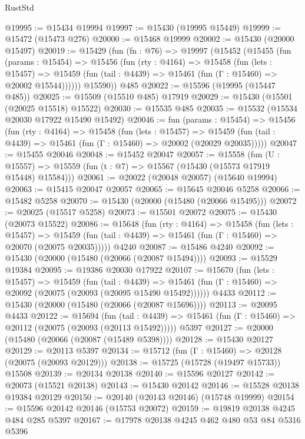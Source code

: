 \begin{lexlean}{RustStd}
\begin{coremodule}
{\begin{coremodule}
{{{{{{{{{{{{{{{{{{{{{{{{{{{{{{{{{{{{{{{{{{{{{{{{{{{{{{{{{{{{@19995 := @15434 @19994
@19997 := @15430 (@19995 @15449)
@19999 := @15472 (@15473 @276)
@20000 := @15468 @19999
@20002 := @15430 (@20000 @15497)
@20019 := @15429
    (fun (fn : @76) =>
    @19997
      (@15452
        (@15455
          (fun (params : @15454) =>
          @15456
            (fun (rty : @4164) =>
            @15458
              (fun (lets : @15457) =>
              @15459 (fun (tail : @4439) => @15461 (fun (Γ : @15460) => @20002 @15544))))))
        @15590))
    @485
@20022 := @15596 (@19995 (@15447 @485))
@20025 := @15509 (@15510 @485) @17919
@20029 := @15430 (@15501 (@20025 @15518) @15522)
@20030 := @15535 @485
@20035 := @15532 (@15534 @20030 @17922 @15490 @15492)
@20046 := fun (params : @15454) =>
  @15456
    (fun (rty : @4164) =>
    @15458
      (fun (lets : @15457) =>
      @15459 (fun (tail : @4439) => @15461 (fun (Γ : @15460) => @20002 (@20029 @20035)))))
@20047 := @15455 @20046
@20048 := @15452 @20047
@20057 := @15558
    (fun (U : @15557) => @15559 (fun (t : @7) => @15567 (@15430 (@15573 @17919 @15448) @15584)))
@20061 := @20022 (@20048 @20057) (@15640 @19994)
@20063 := @15415 @20047 @20057
@20065 := @15645 @20046 @5258
@20066 := @15482 @5258
@20070 := @15430 (@20000 (@15480 (@20066 @15495)))
@20072 := @20025 (@15517 @5258)
@20073 := @15501 @20072
@20075 := @15430 (@20073 @15522)
@20086 := @15648
    (fun (rty : @4164) =>
    @15458
      (fun (lets : @15457) =>
      @15459 (fun (tail : @4439) => @15461 (fun (Γ : @15460) => @20070 (@20075 @20035)))))
    @4240
@20087 := @15486 @4240
@20092 := @15430 (@20000 (@15480 (@20066 (@20087 @15494))))
@20093 := @15529 @19384
@20095 := @19386 @20030 @17922
@20107 := @15670
    (fun (lets : @15457) =>
    @15459
      (fun (tail : @4439) =>
      @15461 (fun (Γ : @15460) => @20092 (@20075 (@20093 (@20095 @15490 @15492))))))
    @4433
@20112 := @15430 (@20000 (@15480 (@20066 (@20087 @15696))))
@20113 := @20095 @4433
@20122 := @15694
    (fun (tail : @4439) => @15461 (fun (Γ : @15460) => @20112 (@20075 (@20093 (@20113 @15492)))))
    @5397
@20127 := @20000 (@15480 (@20066 (@20087 (@15489 @5398))))
@20128 := @15430 @20127
@20129 := @20113 @5397
@20134 := @15712 (fun (Γ : @15460) => @20128 (@20075 (@20093 @20129)))
@20138 := @15725 (@15728 (@19497 @15733)) @15508
@20139 := @20134 @20138
@20140 := @15596 @20127
@20142 := @20073 (@15521 @20138)
@20143 := @15430 @20142
@20146 := @15528 @20138 @19384 @20129
@20150 := @20140 (@20143 @20146) (@15748 @19999)
@20154 := @15596 @20142 @20146 (@15753 @20072)
@20159 := @19819 @20138 @4245 @484 @285 @5397
@20167 := @17978 @20138 @4245 @462 @480 @53 @84 @5316 @5396
}}}}}}}}}}}}}}}}}}}}}}}}}}}}}}}}}}}}}}}}}}}}}}}}}}}}}}}}}}}}
\end{coremodule}}
\end{coremodule}
\end{lexlean}
